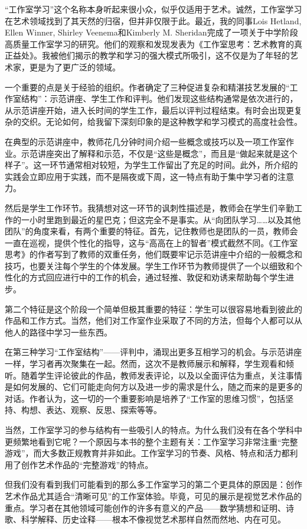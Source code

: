 “工作室学习”这个名称本身听起来很小众，似乎仅适用于艺术。诚然，工作室学习在艺术领域找到了其天然的归宿，但并非仅限于此。最近，我的同事Lois Hetland, Ellen Winner, Shirley Veenema和Kimberly M. Sheridan完成了一项关于中学阶段高质量工作室学习的研究。他们的观察和发现发表为《工作室思考：艺术教育的真正益处》。我被他们揭示的教学和学习的强大模式所吸引，这不仅是为了年轻的艺术家，更是为了更广泛的领域。

一个重要的点是关于经验的组织。作者确定了三种促进复杂和精湛技艺发展的“工作室结构”：示范讲座、学生工作和评判。他们发现这些结构通常是依次进行的，从示范讲座开始，进入长时间的学生工作，最后以评判过程结束。有时会出现更复杂的交织。无论如何，给我留下深刻印象的是这种教学和学习模式的高度社会性。

在典型的示范讲座中，教师花几分钟时间介绍一些概念或技巧以及一项工作室作业。示范讲座突出了解释和示范，不仅是“这些是概念”，而且是“做起来就是这个样子”。这一环节通常相对较短，为学生工作留出了充足的时间。此外，所介绍的实践会立即应用于实践，而不是隔夜或下周，这一特点有助于集中学习者的注意力。

然后是学生工作环节。我猜想对这一环节的讽刺性描述是，教师会在学生们辛勤工作的一小时里跑到最近的星巴克；但这完全不是事实。从“向团队学习……以及其他团队”的角度来看，有两个重要的特征。首先，记住教师也是团队的一员，教师会一直在巡视，提供个性化的指导，这与“高高在上的智者”模式截然不同。《工作室思考》的作者写到了教师的双重任务，他们既要牢记示范讲座中介绍的一般概念和技巧，也要关注每个学生的个体发展。学生工作环节为教师提供了一个以细致和个性化的方式回应进行中的工作的机会，通过轻推、敦促和劝诱来帮助每个学生进步。

第二个特征是这个阶段一个简单但极其重要的特征：学生可以很容易地看到彼此的作品和工作方式。当然，他们对工作室作业采取了不同的方法，但每个人都可以从他人的路径中学习一些东西。

在第三种学习“工作室结构”——评判中，涌现出更多互相学习的机会。与示范讲座一样，学习者再次聚集在一起。然而，这次不是教师展示和解释，学生观看和倾听。随着学生评论彼此的作品，教师发表评论，以及以全面评估为重点，关注事情是如何发展的、它们可能走向何方以及进一步的需求是什么，随之而来的是更多的对话。作者认为，这一切的一个重要影响是培养了“工作室的思维习惯”，包括坚持、构想、表达、观察、反思、探索等等。

当然，工作室学习的参与结构有一些吸引人的特点。为什么我们没有在各个学科中更频繁地看到它呢？一个原因与本书的整个主题有关：工作室学习非常注重“完整游戏”，而大多数正规教育并非如此。工作室学习的节奏、风格、特点和活力都利用了创作艺术作品的“完整游戏”的特点。

但我们没有看到我们可能看到的那么多工作室学习的第二个更具体的原因是：创作艺术作品尤其适合“清晰可见”的工作室体验。毕竟，可见的展示是视觉艺术作品的重点。学习者在其他领域可能创作的许多有意义的产品——数学猜想和证明、诗歌、科学解释、历史诠释——根本不像视觉艺术那样自然而然地、内在可见。

